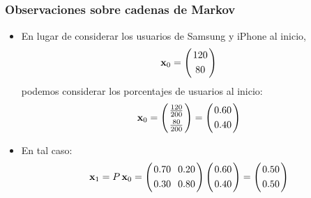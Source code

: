 
\subsection{}

\begin{frame}\frametitle{Observaciones sobre cadenas de Markov}
	
	\begin{itemize}\justifying 
		\item En lugar de considerar los usuarios de Samsung y iPhone al inicio,
		\[
		\mathbf{x}_0 = 
		\left(
		\begin{array}{@{\hspace{0.2\tabcolsep}}c@{\hspace{0.2\tabcolsep}}}
		120 \\[1mm]
		80
		\end{array}
		\right)
		\]
		podemos considerar los porcentajes de usuarios al inicio:
		\[
		\mathbf{x}_0 = 
		\left(
		\begin{array}{@{\hspace{0.2\tabcolsep}}c@{\hspace{0.2\tabcolsep}}}
		\frac{120}{200} \\[1mm]
		\frac{80}{200}
		\end{array}
		\right)
		=
		\left(
		\begin{array}{@{\hspace{0.2\tabcolsep}}c@{\hspace{0.2\tabcolsep}}}
		0.60 \\[1mm]
		0.40
		\end{array}
		\right)
		\]
		
		\item En tal caso:
		\[
		\mathbf{x}_1 = P\, \mathbf{x}_0 = 
		\left(
		\begin{array}{@{\hspace{0.2\tabcolsep}}c@{\hspace{1.2\tabcolsep}}c@{\hspace{0.2\tabcolsep}}}
		0.70 & 0.20 \\[1mm]
		0.30 & 0.80
		\end{array}
		\right) 
		\left(
		\begin{array}{@{\hspace{0.2\tabcolsep}}c@{\hspace{0.2\tabcolsep}}}
		0.60 \\[1mm]
		0.40
		\end{array}
		\right)
		=
		\left(
		\begin{array}{@{\hspace{0.2\tabcolsep}}c@{\hspace{0.2\tabcolsep}}}
		0.50 \\[1mm]
		0.50
		\end{array}
		\right)
		\]
		

\end{itemize}
\end{frame}
